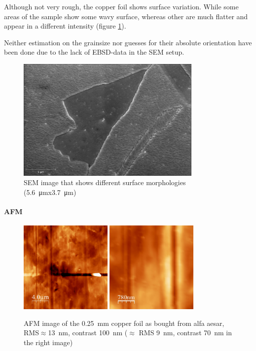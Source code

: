 Although not very rough, the copper foil shows surface variation. While some areas of the sample show some wavy surface, whereas other are much flatter and appear in a different intensity (figure \ref{SEM-surface}).

Neither estimation on the grainsize nor guesses for their absolute orientation have been done due to the lack of EBSD-data in the SEM setup.

\begin{figure}[]
	\begin{center}
		\includegraphics[height=6cm]{./images/Domenik_16031700.jpg}
	\end{center}
	\caption{SEM image that shows different surface morphologies (\SI{5.6}{\micro \meter}x\SI{3.7}{\micro \meter})}
	\label{SEM-surface}
\end{figure}

\paragraph{AFM}
\begin{figure}[]
	\centering
	\includegraphics[width=0.4\textwidth]{./images/as_bought0000.jpg}
	\includegraphics[width=0.4\textwidth]{./images/as_bought0001.jpg}
	\caption{AFM image of the \SI{0.25}{\mm} copper foil as bought from alfa aesar, RMS$\approx$\SI{13}{\nm}, contrast \SI{100}{\nm} ($\approx$ RMS \SI{9}{\nm}, contrast \SI{70}{\nm} in the right image)}
	\label{fig:foil-afm-as-bought}
\end{figure}

